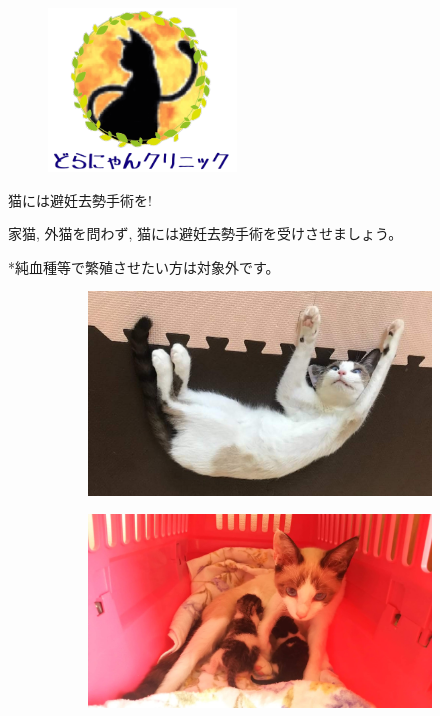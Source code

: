 \documentclass{jsarticle}
\begin{document}
\begin{figure}[htbp]
	\begin{center}
		\includegraphics[width=5cm]{Tra2.png}
	\end{center}
\end{figure}

\Huge
\vspace{-10pt}
  猫には避妊去勢手術を!

\Large
  家猫, 外猫を問わず, 猫には避妊去勢手術を受けさせましょう。

  *純血種等で繁殖させたい方は対象外です。


\vspace{30pt}

	\begin{figure}[htbp]
		\centering
		\begin{subfigure}{0.4\columnwidth}
			\centering
			\includegraphics[width=\columnwidth]{2.jpg}
		\end{subfigure}
		\begin{subfigure}{0.4\columnwidth}
			\centering
			\includegraphics[width=\columnwidth]{1.jpg}
		\end{subfigure}
	\end{figure}
\end{document}
